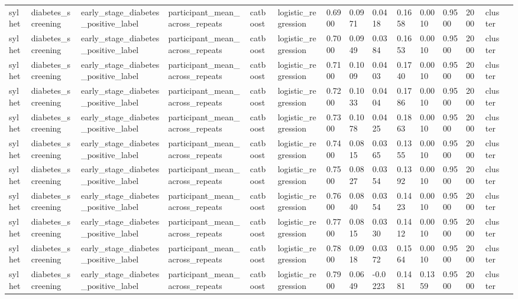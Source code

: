 \begin{tabular}{lllllllllllllll}
sylhet & diabetes\_screening & early\_stage\_diabetes\_positive\_label & participant\_mean\_across\_repeats & catboost & logistic\_regression & 0.6900 & 0.0971 & 0.0418 & 0.1658 & 0.0010 & 0.9500 & 2000 & cluster &  \\
sylhet & diabetes\_screening & early\_stage\_diabetes\_positive\_label & participant\_mean\_across\_repeats & catboost & logistic\_regression & 0.7000 & 0.0949 & 0.0384 & 0.1653 & 0.0010 & 0.9500 & 2000 & cluster &  \\
sylhet & diabetes\_screening & early\_stage\_diabetes\_positive\_label & participant\_mean\_across\_repeats & catboost & logistic\_regression & 0.7100 & 0.1009 & 0.0403 & 0.1740 & 0.0010 & 0.9500 & 2000 & cluster &  \\
sylhet & diabetes\_screening & early\_stage\_diabetes\_positive\_label & participant\_mean\_across\_repeats & catboost & logistic\_regression & 0.7200 & 0.1033 & 0.0404 & 0.1786 & 0.0010 & 0.9500 & 2000 & cluster &  \\
sylhet & diabetes\_screening & early\_stage\_diabetes\_positive\_label & participant\_mean\_across\_repeats & catboost & logistic\_regression & 0.7300 & 0.1078 & 0.0425 & 0.1863 & 0.0010 & 0.9500 & 2000 & cluster &  \\
sylhet & diabetes\_screening & early\_stage\_diabetes\_positive\_label & participant\_mean\_across\_repeats & catboost & logistic\_regression & 0.7400 & 0.0815 & 0.0365 & 0.1355 & 0.0010 & 0.9500 & 2000 & cluster &  \\
sylhet & diabetes\_screening & early\_stage\_diabetes\_positive\_label & participant\_mean\_across\_repeats & catboost & logistic\_regression & 0.7500 & 0.0827 & 0.0354 & 0.1392 & 0.0010 & 0.9500 & 2000 & cluster &  \\
sylhet & diabetes\_screening & early\_stage\_diabetes\_positive\_label & participant\_mean\_across\_repeats & catboost & logistic\_regression & 0.7600 & 0.0840 & 0.0354 & 0.1423 & 0.0010 & 0.9500 & 2000 & cluster &  \\
sylhet & diabetes\_screening & early\_stage\_diabetes\_positive\_label & participant\_mean\_across\_repeats & catboost & logistic\_regression & 0.7700 & 0.0815 & 0.0330 & 0.1412 & 0.0010 & 0.9500 & 2000 & cluster &  \\
sylhet & diabetes\_screening & early\_stage\_diabetes\_positive\_label & participant\_mean\_across\_repeats & catboost & logistic\_regression & 0.7800 & 0.0918 & 0.0372 & 0.1564 & 0.0010 & 0.9500 & 2000 & cluster &  \\
sylhet & diabetes\_screening & early\_stage\_diabetes\_positive\_label & participant\_mean\_across\_repeats & catboost & logistic\_regression & 0.7900 & 0.0649 & -0.0223 & 0.1481 & 0.1359 & 0.9500 & 2000 & cluster &  \\

\end{tabular}
